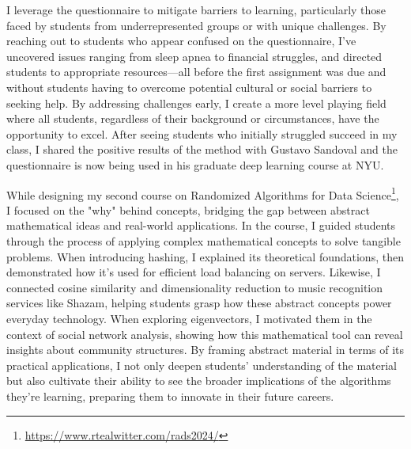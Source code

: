 \documentclass[11pt]{article}
\begin{document}
{I leverage the questionnaire to mitigate barriers to learning, particularly those faced by students from underrepresented groups or with unique challenges. By reaching out to students who appear confused on the questionnaire, I've uncovered issues ranging from sleep apnea to financial struggles, and directed students to appropriate resources—all before the first assignment was due and without students having to overcome potential cultural or social barriers to seeking help. By addressing challenges early, I create a more level playing field where all students, regardless of their background or circumstances, have the opportunity to excel. After seeing students who initially struggled succeed in my class, I shared the positive results of the method with Gustavo Sandoval and the questionnaire is now being used in his graduate deep learning course at NYU.

While designing my second course on Randomized Algorithms for Data Science\footnote{\url{https://www.rtealwitter.com/rads2024/}}, I focused on the "why" behind concepts, bridging the gap between abstract mathematical ideas and real-world applications. In the course, I guided students through the process of applying complex mathematical concepts to solve tangible problems. When introducing hashing, I explained its theoretical foundations, then demonstrated how it's used for efficient load balancing on servers. Likewise, I connected cosine similarity and dimensionality reduction to music recognition services like Shazam, helping students grasp how these abstract concepts power everyday technology. When exploring eigenvectors, I motivated them in the context of social network analysis, showing how this mathematical tool can reveal insights about community structures. By framing abstract material in terms of its practical applications, I not only deepen students' understanding of the material but also cultivate their ability to see the broader implications of the algorithms they're learning, preparing them to innovate in their future careers.


}
\end{document}
